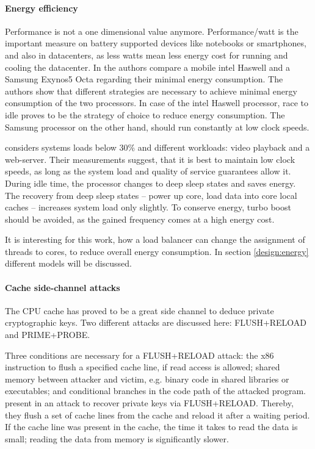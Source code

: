 \paragraph{Energy efficiency}
Performance is not a one dimensional value anymore.
Performance/watt is the important measure on battery supported devices like
notebooks or smartphones, and also in datacenters, as less watts mean less
energy cost for running and cooling the datacenter.
In \cite{imes_poet_2015} the authors compare a mobile \gls{intel} Haswell and a
Samsung Exynos5 Octa regarding their minimal energy consumption.
The authors show that different strategies are necessary to achieve minimal
energy consumption of the two processors.
In case of the \gls{intel} Haswell processor, race to idle proves to be the
strategy of choice to reduce energy consumption.
The Samsung processor on the other hand, should run constantly at low clock
speeds.

\cite{le_sueur_slow_2011} considers systems loads below 30\% and different
workloads: video playback and a web-server.
Their measurements suggest, that it is best to maintain low clock speeds, as
long as the system load and quality of service guarantees allow it.
During idle time, the processor changes to deep sleep states and saves
energy.
The recovery from deep sleep states -- power up core, load data into core local
caches -- increases system load only slightly.
To conserve energy, turbo boost should be avoided, as the gained frequency
comes at a high energy cost.

It is interesting for this work, how a load balancer can change the assignment
of threads to cores, to reduce overall energy consumption.
In section \ref{design:energy} different models will be discussed.
\\

\paragraph{Cache side-channel attacks}
The CPU cache has proved to be a great side channel to deduce private
cryptographic keys.
Two different attacks are discussed here: FLUSH+RELOAD and PRIME+PROBE.

Three conditions are necessary for a FLUSH+RELOAD attack:
the x86 instruction to flush a specified cache line, if read access is allowed;
shared memory between attacker and victim, e.g. binary
code in shared libraries or executables;
and conditional branches in the code path of the attacked program.
\citeauthor{yarom_recovering_2014} present in \cite{yarom_recovering_2014} an
attack to recover private keys via FLUSH+RELOAD.
Thereby, they flush a set of cache lines from the cache and reload it after a
waiting period.
If the cache line was present in the cache, the time it takes to read the data
is small; reading the data from memory is significantly slower.

